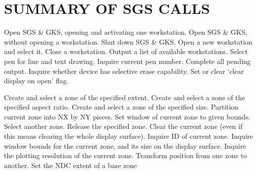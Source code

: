 \section{SUMMARY OF SGS CALLS}\label{sec-summary}

\begin{routinelist}
   Open SGS \& GKS, opening and activating one workstation.
   Open SGS \& GKS, without opening a workstation.
   Shut down SGS \& GKS.
   Open a new workstation and select it.
   Close a workstation.
   Output a list of available workstations.
   Select pen for line and text drawing.
   Inquire current pen number.
   Complete all pending output.
   Inquire whether device has selective erase capability.
   Set or clear `clear display on open' flag.
\end{routinelist}

\begin{routinelist}
   Create and select a zone of the specified extent.
   Create and select a zone of the specified aspect ratio.
   Create and select a zone of the specified size.
   Partition current zone into NX by NY pieces.
   Set window of current zone to given bounds.
   Select another zone.
   Release the specified zone.
   Clear the current zone (even if this means clearing the whole display
   surface).
   Inquire ID of current zone.
   Inquire window bounds for the current zone, and its size on the display
   surface.
   Inquire the plotting resolution of the current zone.
   Transform position from one zone to another.
   Set the NDC extent of a base zone
\end{routinelist}

